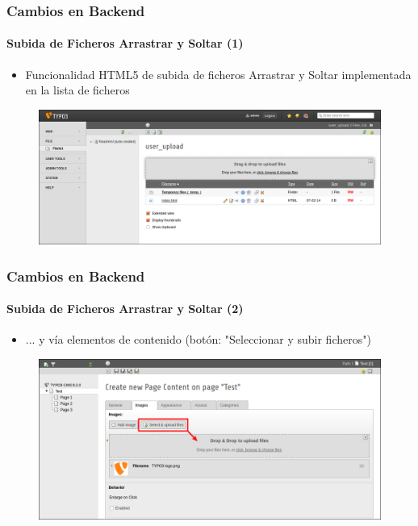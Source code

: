 
\begin{frame}[fragile]
	\frametitle{Cambios en Backend}
	\framesubtitle{Subida de Ficheros Arrastrar y Soltar (1)}

	\begin{itemize}
		\item Funcionalidad HTML5 de subida de ficheros Arrastrar y Soltar implementada en la lista de ficheros

	\end{itemize}

	\begin{figure}
		\includegraphics[width=0.95\linewidth]{Images/BackendChanges/DragDropFileUpload.png}
	\end{figure}

\end{frame}


\begin{frame}[fragile]
	\frametitle{Cambios en Backend}
	\framesubtitle{Subida de Ficheros Arrastrar y Soltar (2)}

	\begin{itemize}
		\item ... y vía elementos de contenido (botón: "Seleccionar y subir ficheros")

	\end{itemize}

	\begin{figure}
		\includegraphics[width=0.95\linewidth]{Images/BackendChanges/SelectAndUploadFiles.png}
	\end{figure}

\end{frame}

